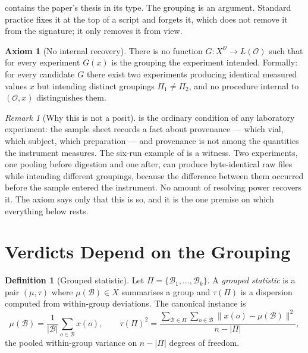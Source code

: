 \documentclass[11pt,a4paper]{article}
\theoremstyle{definition}
\newtheorem{definition}[theorem]{Definition}
\newtheorem{axiom}[theorem]{Axiom}
\theoremstyle{remark}
\newtheorem{remark}[theorem]{Remark}
\newcommand{\Obs}{\mathcal{O}}               %
\newcommand{\grp}{\mathcal{B}}               %
\newcommand{\Part}{\Pi}                      %
\begin{document}
 contains the paper's thesis in its type. The grouping
is an argument. Standard practice fixes it at the top of a script and
forgets it, which does not remove it from the signature; it only removes
it from view.

\begin{axiom}[No internal recovery]\label{ax:no-internal}
There is no function $G : X^{\Obs} \to L(\Obs)$ such that for every
experiment $G(x)$ is the grouping the experiment intended. Formally: for
every candidate $G$ there exist two experiments producing identical
measured values $x$ but intending distinct groupings
$\Part_1 \neq \Part_2$, and no procedure internal to $(\Obs,x)$
distinguishes them.
\end{axiom}

\begin{remark}[Why this is not a posit]\label{rem:ax-reading}
 is the ordinary condition of any laboratory
experiment: the sample sheet records a fact about provenance --- which
vial, which subject, which preparation --- and provenance is not among
the quantities the instrument measures. The six-run example of
 is a witness. Two experiments, one pooling before
digestion and one after, can produce byte-identical raw files while
intending different groupings, because the difference between them
occurred before the sample entered the instrument. No amount of resolving
power recovers it. The axiom says only that this is so, and it is the one
premise on which everything below rests.
\end{remark}

\section{Verdicts Depend on the Grouping}
\label{sec:lattice}

\begin{definition}[Grouped statistic]\label{def:stat}
Let $\Part = \{\grp_1,\dots,\grp_k\}$. A \emph{grouped statistic} is a
pair $(\mu,\tau)$ where $\mu(\grp) \in X$ summarises a group and
$\tau(\Part)$ is a dispersion computed from within-group deviations. The
canonical instance is
\[
\mu(\grp) = \frac{1}{|\grp|}\sum_{o \in \grp} x(o),
\qquad
\tau(\Part)^2 = \frac{\sum_{\grp \in \Part}\sum_{o\in\grp}
\|x(o)-\mu(\grp)\|^2}{n - |\Part|},
\]
the pooled within-group variance on $n - |\Part|$ degrees of freedom.
\end{definition}
\end{document}
